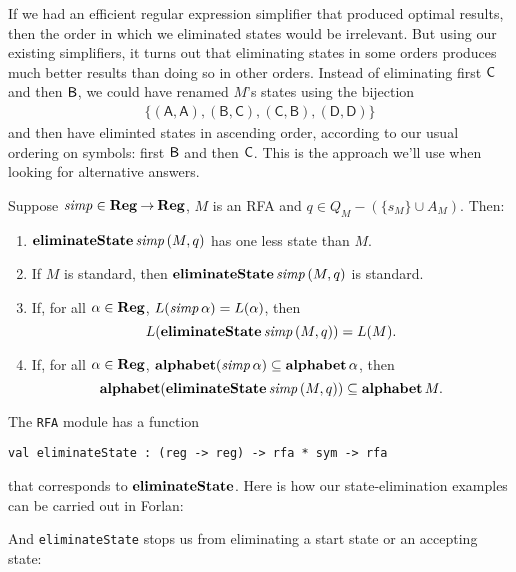 If we had an efficient regular expression simplifier that produced
optimal results, then the order in which we eliminated states would be
irrelevant.  But using our existing simplifiers, it turns out that
eliminating states in some orders produces much better results than
doing so in other orders.  Instead of eliminating first $\mathsf{C}$ and then
$\mathsf{B}$, we could have renamed $M$'s states using the bijection
\begin{gather*}
\{\mathsf{(A, A), (B, C), (C, B), (D, D)}\}  
\end{gather*}
and then have eliminted states in ascending order, according
to our usual ordering on symbols: first $\mathsf{B}$ and then $\mathsf{C}$.
This is the approach we'll use when looking for alternative answers.

\begin{proposition}
Suppose ${\it simp}\in\mathbf{Reg}\mathbin{\to}\mathbf{Reg}$, $M$ is an RFA and $q\in
Q_M-(\{s_M\}\cup A_M)$.  Then:
\begin{enumerate}[\quad(1)]
\item $\mathbf{eliminateState}\,{\it simp}\,(M,q)$ has one less state than $M$.

\item If $M$ is standard, then $\mathbf{eliminateState}\,{\it simp}\,(M,q)$ is standard.

\item If, for all $\alpha\in\mathbf{Reg}$, $L({\it simp}\,\alpha) = L(\alpha)$,
  then
  \begin{displaymath}
    L(\mathbf{eliminateState}\,{\it simp}\,(M,q)) = L(M) .  
  \end{displaymath}

\item If, for all $\alpha\in\mathbf{Reg}$, $\mathbf{alphabet}({\it simp}\,\alpha)\subseteq
  \mathbf{alphabet}\,\alpha$, then
  \begin{displaymath}
    \mathbf{alphabet}(\mathbf{eliminateState}\,{\it simp}\,(M,q)) \subseteq \mathbf{alphabet}\,M .
  \end{displaymath}
\end{enumerate}
\end{proposition}

The \texttt{RFA} module has a function
\begin{verbatim}
val eliminateState : (reg -> reg) -> rfa * sym -> rfa
\end{verbatim}
that corresponds to $\mathbf{eliminateState}$.
Here is how our state-elimination examples can be carried out in Forlan:

And \texttt{eliminateState} stops us from eliminating a start state or
an accepting state:


